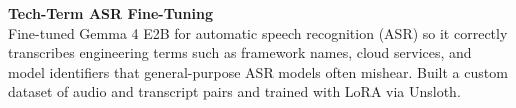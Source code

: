 \textbf{Tech-Term ASR Fine-Tuning}\\
Fine-tuned Gemma 4 E2B for automatic speech recognition (ASR) so it correctly transcribes engineering terms such as framework names, cloud services, and model identifiers that general-purpose ASR models often mishear. Built a custom dataset of audio and transcript pairs and trained with LoRA via Unsloth.
